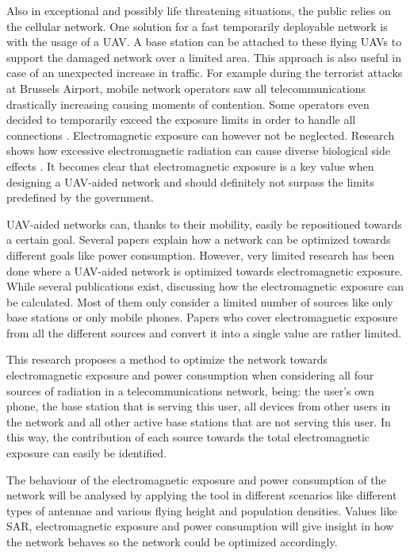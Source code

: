 \documentclass[twocolumn]{phdsymp} %
\begin{document}
Also in exceptional and possibly life threatening situations, the public relies on the cellular network. 
One solution for a fast temporarily deployable network is with the usage of a \gls{UAV}. A base station can be attached to 
these flying \gls{UAV}s to support the damaged network over a limited area. 
This approach is also useful in case of an unexpected increase in traffic. 
For example during the terrorist attacks at Brussels Airport,
mobile network operators saw all telecommunications drastically increasing causing moments of contention. 
Some operators even decided to temporarily exceed the exposure limits in
order to handle all connections \cite{baseZaventem}.
Electromagnetic exposure can however not be neglected. 
Research shows how excessive electromagnetic radiation can cause diverse biological side effects \cite{bioeffects, WHO}.
It becomes clear that electromagnetic exposure is a key value when designing a \gls{UAV}-aided network and should definitely 
not surpass the limits predefined by the government.

\gls{UAV}-aided networks can, thanks to their mobility, easily be repositioned towards a certain goal. Several papers 
explain how a network can be optimized towards different goals like power consumption.
However, very limited
research has been done where a \gls{UAV}-aided network is optimized towards electromagnetic exposure.
While several publications exist, discussing how the electromagnetic exposure can be calculated. 
Most of them only consider a limited number of sources like only base stations or only mobile phones.
Papers who cover electromagnetic exposure from all the different sources and convert it into a single value are rather limited.

This research proposes a method to optimize the network towards electromagnetic exposure and power consumption
when considering all four sources of radiation in a telecommunications network, being: the user's own phone,
 the base station that is serving this user, 
all devices from other users in the network and all 
other active base stations that are not serving this user. In this way, the contribution of each source towards the total 
electromagnetic exposure can easily be identified. 

The behaviour of the electromagnetic exposure and power consumption of the network will be analysed
 by applying the tool in different scenarios like different types of antennae and various flying height and population 
densities.
Values like \gls{SAR}, electromagnetic exposure and power consumption will 
 give insight in how the network behaves so the network could be optimized accordingly.
\end{document}
